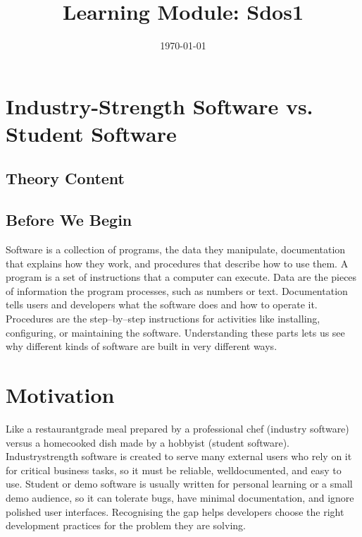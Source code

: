 \documentclass[12pt, a4paper]{article}
\title{Learning Module: Sdos1}
\author{}
\date{\today}
\begin{document}
\maketitle
\thispagestyle{empty}
\newpage

\tableofcontents
\newpage


\section{Industry-Strength Software vs. Student Software}

\subsection{Theory Content}
\subsection{Before We Begin}
Software is a collection of programs, the data they manipulate, documentation that explains how they work, and procedures that describe how to use them. A program is a set of instructions that a computer can execute. Data are the pieces of information the program processes, such as numbers or text. Documentation tells users and developers what the software does and how to operate it. Procedures are the step--by--step instructions for activities like installing, configuring, or maintaining the software. Understanding these parts lets us see why different kinds of software are built in very different ways.  

\section{Motivation}
Like a restaurantgrade meal prepared by a professional chef (industry software) versus a homecooked dish made by a hobbyist (student software). Industrystrength software is created to serve many external users who rely on it for critical business tasks, so it must be reliable, welldocumented, and easy to use. Student or demo software is usually written for personal learning or a small demo audience, so it can tolerate bugs, have minimal documentation, and ignore polished user interfaces. Recognising the gap helps developers choose the right development practices for the problem they are solving.  
\end{document}
